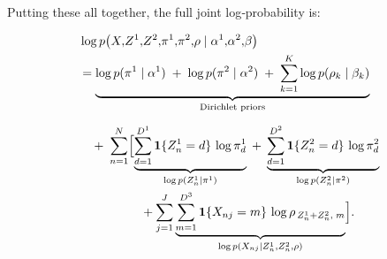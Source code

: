 \documentclass{article}
\begin{document}
\noindent
Putting these all together, the full joint log‐probability is:

\[
\begin{aligned}
&\log p\bigl(X,\!Z^1,\!Z^2,\!\pi^1,\!\pi^2,\!\rho 
    \mid \alpha^1,\!\alpha^2,\!\beta \bigr) \\
&=
\underbrace{\log p(\pi^1 \mid \alpha^1)
\;+\;
\log p(\pi^2 \mid \alpha^2)
\;+\;
\sum_{k=1}^K \log p(\rho_k \mid \beta_k)}_{\text{Dirichlet priors}}
\\[6pt]
&\quad
+\;
\sum_{n=1}^N 
\Bigl[
  \underbrace{\sum_{d=1}^{D^1} \mathbf{1}\{Z^1_n = d\}\,\log \pi^1_{d}}_{\log p(Z^1_n \mid \pi^1)}
  \;+\;
  \underbrace{\sum_{d=1}^{D^2} \mathbf{1}\{Z^2_n = d\}\,\log \pi^2_{d}}_{\log p(Z^2_n \mid \pi^2)}
\\
&\qquad\qquad\quad
  + \sum_{j=1}^J
    \underbrace{\sum_{m=1}^{D^3}
      \mathbf{1}\{X_{nj} = m\}\,\log \rho_{\,Z^1_n + Z^2_n,\;m}}_{\log p(X_{nj} \mid Z^1_n,Z^2_n,\rho)}
\Bigr].
\end{aligned}
\]
\end{document}
